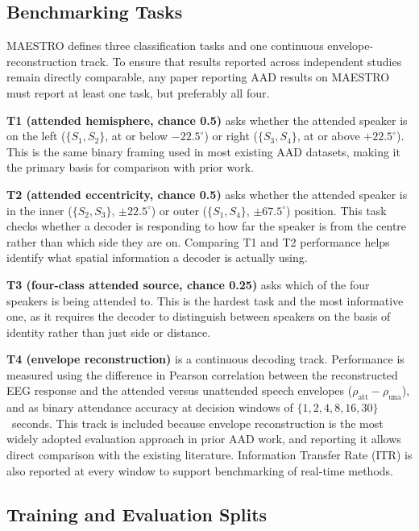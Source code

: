 \documentclass{article}
\begin{document}
\subsection{Benchmarking Tasks} \label{ssec:tasks}

MAESTRO defines three classification tasks and one continuous 
envelope-reconstruction track. To ensure that results reported across 
independent studies remain directly comparable, any paper reporting AAD results on MAESTRO must report at least one task, but preferably all four.

\textbf{T1 (attended hemisphere, chance 0.5)} asks whether the attended 
speaker is on the left ($\{S_1, S_2\}$, at or below $-22.5^\circ$) or 
right ($\{S_3, S_4\}$, at or above $+22.5^\circ$). This is the same binary 
framing used in most existing AAD datasets, making it the primary basis for 
comparison with prior work.

\textbf{T2 (attended eccentricity, chance 0.5)} asks whether the attended 
speaker is in the inner ($\{S_2, S_3\}$, $\pm 22.5^\circ$) or outer 
($\{S_1, S_4\}$, $\pm 67.5^\circ$) position. This task checks whether a 
decoder is responding to how far the speaker is from the centre rather than 
which side they are on. Comparing T1 and T2 performance helps identify what 
spatial information a decoder is actually using.

\textbf{T3 (four-class attended source, chance 0.25)} asks which of the four 
speakers is being attended to. This is the hardest task and the most 
informative one, as it requires the decoder to distinguish between speakers 
on the basis of identity rather than just side or distance.

\textbf{T4 (envelope reconstruction)} is a continuous decoding track. 
Performance is measured using the difference in Pearson correlation between 
the reconstructed EEG response and the attended versus unattended speech 
envelopes ($\rho_{\text{att}} - \rho_{\text{una}}$), and as binary attendance 
accuracy at decision windows of $\{1, 2, 4, 8, 16, 30\}$~seconds. This track 
is included because envelope reconstruction is the most widely adopted 
evaluation approach in prior AAD work, and reporting it allows direct 
comparison with the existing literature. Information Transfer Rate (ITR) is also 
reported at every window to support benchmarking of real-time methods.

\subsection{Training and Evaluation Splits} \label{ssec:splits}
\end{document}
